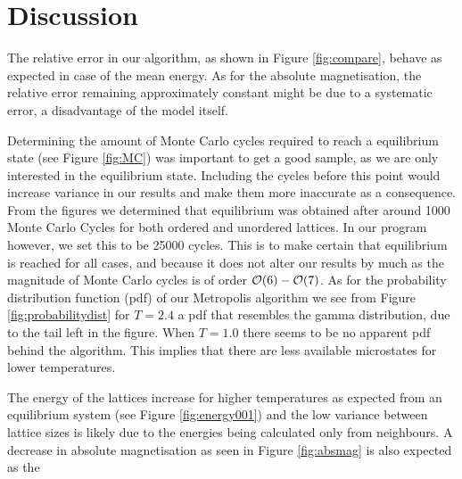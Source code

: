 \section{Discussion}
\label{sec:discussion}
The relative error in our algorithm, as shown in Figure \ref{fig:compare}, behave as expected in case of the mean energy. As for the absolute magnetisation, the relative error remaining approximately constant might be due to a systematic error, a disadvantage of the model itself.

Determining the amount of Monte Carlo cycles required to reach a equilibrium state (see Figure \ref{fig:MC}) was important to get a good sample, as we are only interested in the equilibrium state. Including the cycles before this point would increase variance in our results and make them more inaccurate as a consequence. From the figures we determined that equilibrium was obtained after around 1000 Monte Carlo Cycles for both ordered and unordered lattices. In our program however, we set this to be 25000 cycles. This is to make certain that equilibrium is reached for all cases, and because it does not alter our results by much as the magnitude of Monte Carlo cycles is of order $\order{6} - \order{7}$. As for the probability distribution function (pdf) of our Metropolis algorithm we see from Figure \ref{fig:probabilitydist} for $T=2.4$ a pdf that resembles the gamma distribution, due to the tail left in the figure. When $T=1.0$ there seems to be no apparent pdf behind the algorithm. This implies that there are less available microstates for lower temperatures.

The energy of the lattices increase for higher temperatures as expected from an equilibrium system (see Figure \ref{fig:energy001}) and the low variance between lattice sizes is likely due to the energies being calculated only from neighbours. A decrease in absolute magnetisation as seen in Figure \ref{fig:absmag} is also expected as the 
